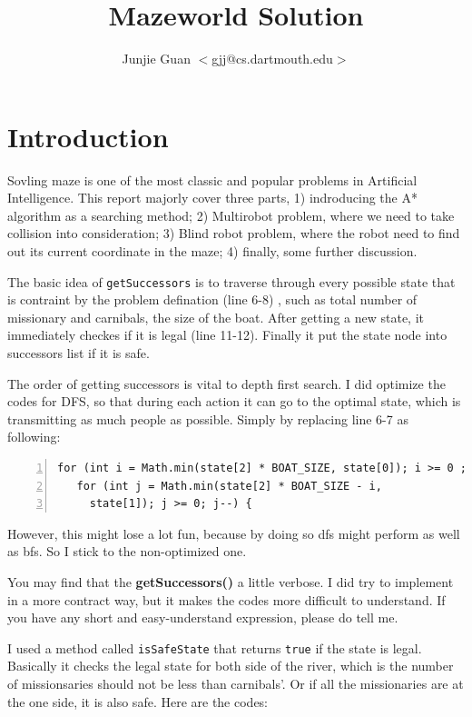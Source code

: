 \documentclass{article}
\title{Mazeworld Solution}
\author{Junjie Guan $<$gjj@cs.dartmouth.edu$>$}
\begin{document}
\maketitle

\section{Introduction}

Sovling maze is one of the most classic and popular problems in Artificial Intelligence. This report majorly cover three parts, 1) indroducing the A* algorithm as a searching method; 2) Multirobot problem, where we need to take collision into consideration; 3) Blind robot problem, where the robot need to find out its current coordinate in the maze; 4) finally, some further discussion.




The basic idea of \verb`getSuccessors` is to traverse through every possible state that is contraint by the problem defination (line 6-8) , such as total number of missionary and carnibals, the size of the boat. After getting a new state, it immediately checkes if it is legal (line 11-12). Finally it put the state node into successors list if it is safe.

The order of getting successors is vital to depth first search. I did optimize the codes for DFS, so that during each action it can go to the optimal state, which is transmitting as much people as possible. Simply by replacing line 6-7 as following:

\begin{lstlisting}[numbers=left]
 for (int i = Math.min(state[2] * BOAT_SIZE, state[0]); i >= 0 ; i--) {
   for (int j = Math.min(state[2] * BOAT_SIZE - i,
     state[1]); j >= 0; j--) {
\end{lstlisting}

However, this might lose a lot fun, because by doing so dfs might perform as well as bfs. So I stick to the non-optimized one.

You may find that the \textbf{getSuccessors()} a little verbose. I did try to implement in a more contract way, but it makes the codes more difficult to understand. If you have any short and easy-understand expression, please do tell me.

I used a method called \verb`isSafeState` that returns \verb`true` if the state is legal. Basically it checks the legal state for both side of the river, which is the number of missionsaries should not be less than carnibals'. Or if all the missionaries are at the one side, it is also safe. Here are the codes:
\end{document}
